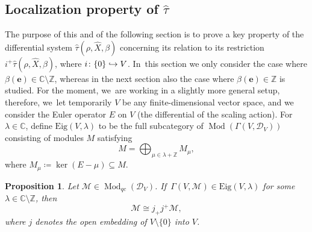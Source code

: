 \documentclass[JEP,XML,SOM,Unicode,published]{cedram}
\let\mathds\mathbb
\newcommand\hto{\mathrel{\lhook\joinrel\to}}
\newcommand{\bme}{{\boldsymbol{e}}}
\newcommand{\Eig}{\mathrm{Eig}}
\newtheorem{prop}[thm]{Proposition}
\newcommand{\dC}{{\mathds C}}\let\C\dC
\newcommand{\dZ}{{\mathds Z}}\let\mbz\dZ\let\Z\dZ
\begin{document}
\subsection{Localization property of \texorpdfstring{$\widehat{\tau}$}{\textbackslash hat\textbackslash tau}}
\label{subsec:LocProp}

The purpose of this and of the following section is to prove a key property of the differential system $\hat{\tau}(\rho, \hat{X},\beta)$ concerning its relation to its restriction $i^+\hat{\tau}(\rho, \hat{X},\beta)$, where $i \colon \{0\}\hto V$. In~this section we only consider the case where $\beta(\bme)\in\dC\setminus \dZ$, whereas in the next section also the case where $\beta(\bme)\in \dZ$ is studied. For the moment, we~are working in a slightly more general setup, therefore, we~let temporarily $V$ be any finite-dimensional vector space, and we consider the Euler operator $E$ on $V$ (\ie the differential of the scaling action). For $\lambda\in \C$, define $\Eig(V,\lambda)$ to be the full subcategory of $\operatorname{Mod}(\Gamma(V, \mathscr{D}_V))$ consisting of modules $M$ satisfying
\begin{equation}
M = \bigoplus_{\mu\in \lambda + \Z} M_\mu,
\end{equation}
where $M_\mu \coloneqq \ker(E-\mu)\subseteq M$.

\begin{prop}\label{prop:Eig-loc}
Let $\mathscr{M}\in \operatorname{Mod}_{qc} (\mathscr{D}_V)$. If~$\Gamma(V, \mathscr{M})\in \Eig(V,\lambda)$ for some $\lambda\in \C\setminus \Z$, then
\[
\mathscr{M}\cong j_+ j^+\mathscr{M},
\]
where $j$ denotes the open embedding of $V \setminus \{0\}$ into $V$.
\end{prop}
\end{document}
